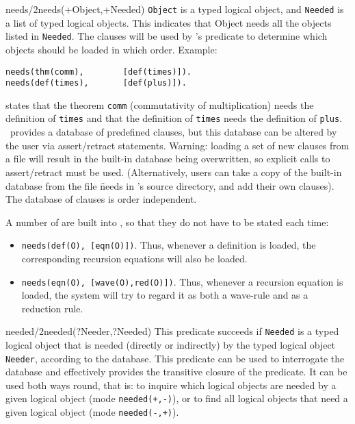 \begin{predicate}{needs/2}{needs(+Object,+Needed)}%
{\tt Object} is a typed logical object, and {\tt Needed} is a list of
typed logical objects. This indicates that Object needs all the
objects listed in {\tt Needed}. The  clauses will be used by
{\clam}'s  predicate to determine which objects should be
loaded in which order. Example:
\begin{verbatim}
needs(thm(comm),        [def(times)]).
needs(def(times),       [def(plus)]).
\end{verbatim}
states that the theorem {\tt comm} (commutativity of multiplication)
needs the definition of {\tt times} and that the definition of
{\tt times} needs the definition of {\tt plus}.
\clam\ provides a database of predefined  clauses,
but this database can be altered by the user via assert/retract
statements. Warning: loading a set of new 
 clauses from a file will result in the built-in database
being overwritten, so explicit calls to assert/retract must be used.
(Alternatively, users can take a copy of the built-in database from
the file \f{needs} in {\clam}'s source directory, and add their own 
clauses). The database of  clauses is order independent.
\end{predicate}

A number of  are built into \clam, so that they
do not have to be stated each time:
\begin{itemize}
\item
{\tt needs(def(O), [eqn(O)])}. Thus, whenever a definition is
loaded, the corresponding recursion equations will also be loaded.
\item
{\tt needs(eqn(O), [wave(O),red(O)])}. Thus, whenever a recursion equation is
loaded, the system will try to regard it as both a wave-rule and as a
reduction rule.
\end{itemize}

\begin{predicate}{needed/2}{needed(?Needer,?Needed)}%
This predicate succeeds if {\tt Needed} is a typed logical object that
is needed (directly or indirectly) by the typed logical object {\tt Needer},
according to the  database.  This predicate can be
used to interrogate the  database and effectively provides
the transitive closure of the  predicate. It can be used
both ways round, that is: to inquire which logical objects are needed by
a given logical object (mode {\tt needed(+,-)}), or to find all logical
objects that need a given logical object (mode {\tt needed(-,+)}).
\end{predicate}

